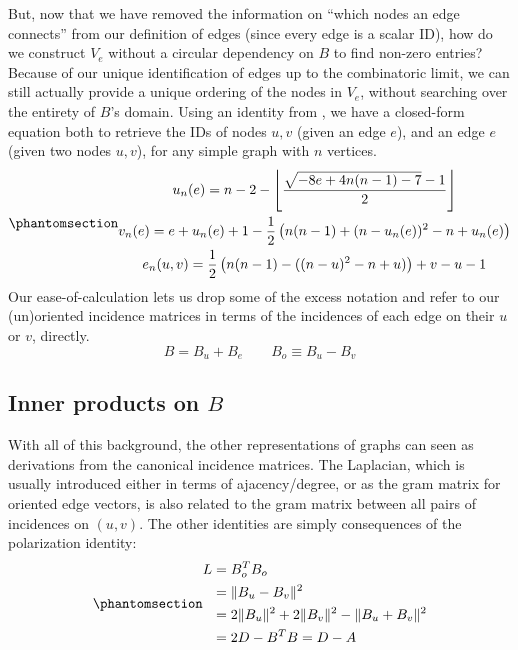 \documentclass[%
	12pt,
		oneside,
		letterpaper
]{book}
\begin{document}
But, now that we have removed the information on ``which nodes an edge
connects'' from our definition of edges (since every edge is a scalar
ID), how do we construct \(V_e\) without a circular dependency on \(B\)
to find non-zero entries? Because of our unique identification of edges
up to the combinatoric limit, we can still actually provide a unique
ordering of the nodes in \(V_e\), without searching over the entirety of
\(B\)'s domain. Using an identity from
\textcite{ParallelEuclideandistance_Angeletti2019}, we have a
closed-form equation both to retrieve the IDs of nodes \(u,v\) (given an
edge \(e\)), and an edge \(e\) (given two nodes \(u,v\)), for any simple
graph with \(n\) vertices.
\begin{equation}\phantomsection\label{eq-sq-id}{
\begin{gathered}
    u_n(e) = n - 2 - \left\lfloor\frac{\sqrt{-8e + 4n(n - 1) - 7}-1}{2}\right\rfloor\\
    v_n(e) = e + u_n(e) + 1 -\frac{1}{2} \left(n (n - 1) + (n - u_n(e))^2 - n+u_n(e)\right)\\
    e_n(u,v) = \frac{1}{2}\left(n(n - 1) - ((n - u)^2 - n+u)\right) + v - u - 1
\end{gathered}
}\end{equation} Our ease-of-calculation lets us drop some of the excess
notation and refer to our (un)oriented incidence matrices in terms of
the incidences of each edge on their \(u\) or \(v\), directly. \[
B = B_u + B_e \qquad B_o \equiv B_u - B_v
\]

\subsection{\texorpdfstring{Inner products on
\(B\)}{Inner products on B}}\label{inner-products-on-b}

With all of this background, the other representations of graphs can
seen as derivations from the canonical incidence matrices. The
Laplacian, which is usually introduced either in terms of
ajacency/degree, or as the gram matrix for oriented edge vectors, is
also related to the gram matrix between all pairs of incidences on
\((u,v)\). The other identities are simply consequences of the
polarization identity:
\begin{equation}\phantomsection\label{eq-laplacian}{
\begin{split}
L & = B_o^TB_o\\
  & = \|B_u - B_v \|^2 \\
  & = 2\|B_u\|^2 +2\|B_v\|^2 - \|B_u + B_v \|^2 \\
  & = 2D - B^TB = D-A
\end{split}
}\end{equation}
\end{document}
